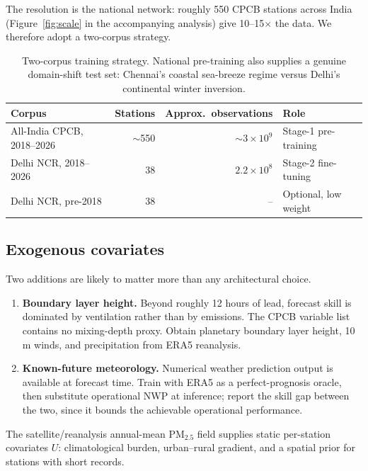 \documentclass[11pt,a4paper]{article}
\begin{document}
The resolution is the national network: roughly 550 CPCB stations across India
(Figure~\ref{fig:scale} in the accompanying analysis) give 10--15$\times$ the
data. We therefore adopt a two-corpus strategy.

\begin{table}[h]
\centering
\begin{tabular}{@{}lrrl@{}}
\toprule
Corpus & Stations & Approx.\ observations & Role \\
\midrule
All-India CPCB, 2018--2026 & $\sim$550 & $\sim3\times10^{9}$ & Stage-1 pre-training \\
Delhi NCR, 2018--2026      & 38        & $2.2\times10^{8}$   & Stage-2 fine-tuning \\
Delhi NCR, pre-2018        & 38        & --                  & Optional, low weight \\
\bottomrule
\end{tabular}
\caption{Two-corpus training strategy. National pre-training also supplies a
genuine domain-shift test set: Chennai's coastal sea-breeze regime versus
Delhi's continental winter inversion.}
\end{table}

\subsection{Exogenous covariates}

Two additions are likely to matter more than any architectural choice.

\begin{enumerate}[leftmargin=1.4em]
\item \textbf{Boundary layer height.} Beyond roughly 12 hours of lead, forecast
skill is dominated by ventilation rather than by emissions. The CPCB variable
list contains no mixing-depth proxy. Obtain planetary boundary layer height,
10\,m winds, and precipitation from ERA5 reanalysis.
\item \textbf{Known-future meteorology.} Numerical weather prediction output is
available at forecast time. Train with ERA5 as a perfect-prognosis oracle, then
substitute operational NWP at inference; report the skill gap between the two,
since it bounds the achievable operational performance.
\end{enumerate}

The satellite/reanalysis annual-mean PM$_{2.5}$ field supplies static
per-station covariates $U$: climatological burden, urban--rural gradient, and a
spatial prior for stations with short records.
\end{document}

